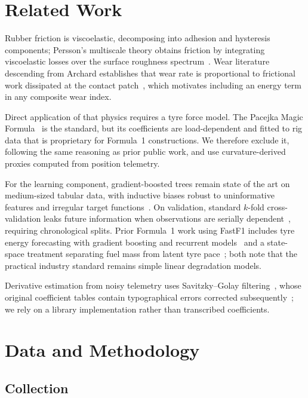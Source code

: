 \documentclass[conference]{IEEEtran}
\begin{document}
\section{Related Work}

Rubber friction is viscoelastic, decomposing into adhesion and hysteresis
components; Persson's multiscale theory obtains friction by integrating
viscoelastic losses over the surface roughness spectrum~\cite{persson2001}.
Wear literature descending from Archard establishes that wear rate is
proportional to frictional work dissipated at the contact
patch~\cite{archard1953}, which motivates including an energy term in any
composite wear index.

Direct application of that physics requires a tyre force model. The Pacejka
Magic Formula~\cite{pacejka2012,bakker1986} is the standard, but its
coefficients are load-dependent and fitted to rig data that is proprietary for
Formula~1 constructions. We therefore exclude it, following the same reasoning
as prior public work, and use curvature-derived proxies computed from position
telemetry.

For the learning component, gradient-boosted trees remain state of the art on
medium-sized tabular data, with inductive biases robust to uninformative
features and irregular target functions~\cite{chen2016,grinsztajn2022}. On
validation, standard $k$-fold cross-validation leaks future information when
observations are serially dependent~\cite{bergmeir2018,bergmeir2012}, requiring
chronological splits. Prior Formula~1 work using FastF1 includes tyre energy
forecasting with gradient boosting and recurrent models~\cite{sulsky2025} and a
state-space treatment separating fuel mass from latent tyre
pace~\cite{statespace2025}; both note that the practical industry standard
remains simple linear degradation models.

Derivative estimation from noisy telemetry uses Savitzky--Golay
filtering~\cite{savitzky1964}, whose original coefficient tables contain
typographical errors corrected subsequently~\cite{steinier1972}; we rely on a
library implementation rather than transcribed coefficients.

\section{Data and Methodology}

\subsection{Collection}
\end{document}
